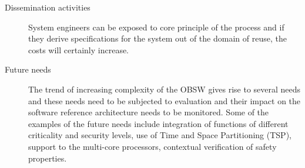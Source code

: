 \begin{description}
\item [Dissemination activities] System engineers can be exposed to core principle of the process and if they derive specifications for the system out of the domain of reuse, the costs will certainly increase.
\item [Future needs] The trend of increasing complexity of the OBSW gives rise to several needs and these needs need to be subjected to evaluation and their impact on the software reference architecture needs to be monitored. Some of the examples of the future needs include integration of functions of different criticality and security levels, use of Time and Space Partitioning (TSP), support to the multi-core processors, contextual verification of safety properties.     
\end{description} 


